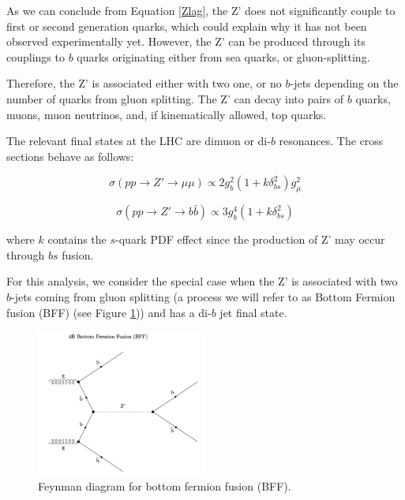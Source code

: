 As we can conclude from Equation \ref{Zlag}, the Z' does not significantly couple to first or second generation quarks, which could explain why it has not been observed experimentally yet. However, the Z' can be produced through its couplings to $b$ quarks originating either from sea quarks, or gluon-splitting. 

Therefore, the Z' is associated either with two one, or no $b$-jets depending on the number of quarks from gluon splitting. The Z' can decay into pairs of $b$ quarks, muons, muon neutrinos, and, if kinematically allowed, top quarks. 

The relevant final states at the LHC are dimuon or di-$b$ resonances. The cross sections behave as follows:

\begin{equation}
\label{crossmu}
\sigma(pp\rightarrow Z' \rightarrow \mu\mu)\propto2g_{b}^{2}(1+k\delta_{bs}^{2})g_{\mu}^{2}
\end{equation}

\begin{equation}
\label{crossb}
\sigma(pp\rightarrow Z' \rightarrow b\bar{b})\propto3g_{b}^{4}(1+k\delta_{bs}^{2})
\end{equation}

where $k$ contains the $s$-quark PDF effect since the production of Z' may occur through $bs$ fusion.

For this analysis, we consider the special case when the Z' is associated with two $b$-jets coming from gluon splitting (a process we will refer to as Bottom Fermion fusion (BFF) (see Figure \ref{fig:bff})) and has a di-$b$ jet final state.

 \begin{figure}[H]
 	\centering
 	\includegraphics[width=0.5\textwidth]{figures/bff.png}
 	\singlespace
 	\caption{Feynman diagram for bottom fermion fusion (BFF).}
 	\label{fig:bff}
 \end{figure}


